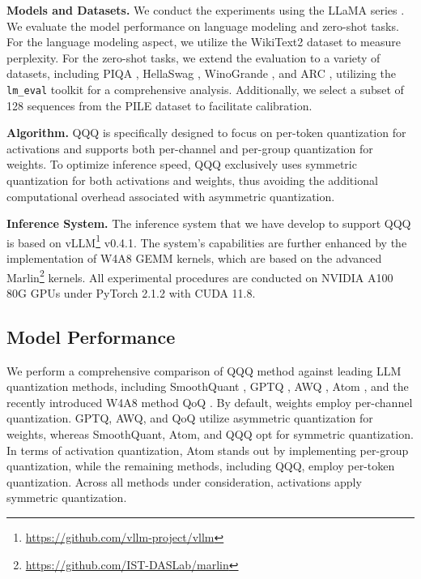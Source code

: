 \textbf{Models and Datasets.} We conduct the experiments using the LLaMA series \cite{touvron2023llama, touvron2023llama2}. We evaluate the model performance on language modeling and zero-shot tasks. For the language modeling aspect, we utilize the WikiText2 \citep{merity2016pointer} dataset to measure perplexity. For the zero-shot tasks, we extend the evaluation to a variety of datasets, including PIQA \citep{bisk2020piqa}, HellaSwag \citep{zellers2019hellaswag}, WinoGrande \citep{sakaguchi2021winogrande}, and ARC \citep{clark2018think}, utilizing the \texttt{lm\_eval} \citep{eval-harness} toolkit for a comprehensive analysis. Additionally, we select a subset of 128 sequences from the PILE \citep{gao2020pile} dataset to facilitate calibration.

\textbf{Algorithm.} QQQ is specifically designed to focus on per-token quantization for activations and supports both per-channel and per-group quantization for weights. To optimize inference speed, QQQ exclusively uses symmetric quantization for both activations and weights, thus avoiding the additional computational overhead associated with asymmetric quantization.

\textbf{Inference System.} The inference system that we have develop to support QQQ is based on vLLM\footnote{\url{https://github.com/vllm-project/vllm}} \citep{kwon2023efficient} v0.4.1. The system's capabilities are further enhanced by the implementation of W4A8 GEMM kernels, which are based on the advanced Marlin\footnote{\url{https://github.com/IST-DASLab/marlin}} \citep{frantar2024marlin} kernels. All experimental procedures are conducted on NVIDIA A100 80G GPUs under PyTorch 2.1.2 with CUDA 11.8.

\subsection{Model Performance}
We perform a comprehensive comparison of QQQ method against leading LLM quantization methods, including SmoothQuant \citep{xiao2023smoothquant}, GPTQ \citep{frantar2022gptq}, AWQ \citep{lin2023awq}, Atom \citep{zhao2023atom}, and the recently introduced W4A8 method QoQ \citep{lin2024qserve}. By default, weights employ per-channel quantization. GPTQ, AWQ, and QoQ utilize asymmetric quantization for weights, whereas SmoothQuant, Atom, and QQQ opt for symmetric quantization. In terms of activation quantization, Atom stands out by implementing per-group quantization, while the remaining methods, including QQQ, employ per-token quantization. Across all methods under consideration, activations apply symmetric quantization.

